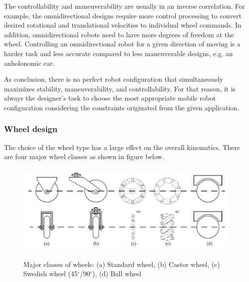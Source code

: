 \documentclass[12pt,english,twoside]{article}
\begin{document}
The controllability and maneuverability are usually in an inverse correlation. For example, the omnidirectional designs require more control processing to convert desired rotational and translational velocities to individual wheel commands. In addition, omnidirectional robots need to have more degrees of freedom at the wheel. Controlling an omnidirectional robot for a given direction of moving is a harder task and less accurate compared to less maneuverable designs, e.g. an anholonomic car.

As conclusion, there is no perfect robot configuration that simultaneously maximizes stability, maneuverability, and controllability. For that reason, it is always the designer's task to choose the most appropriate mobile robot configuration considering the constraints originated from the given application. \cite{sieg}


\subsubsection{Wheel design}
The choice of the wheel type has a large effect on the overall kinematics. There are four major wheel classes as shown in figure below.
\begin{figure}[h]
	\centering
	\includegraphics[height=4.5cm]{figures/wheels4.png}
	\label{wheels}
	\caption{Major classes of wheels: 
		(a) Standard wheel, (b) Castor wheel, (c) Swedish wheel (45$^{\circ}$/90$^{\circ}$), (d) Ball wheel \cite{sieg}}
\end{figure}
\end{document}
